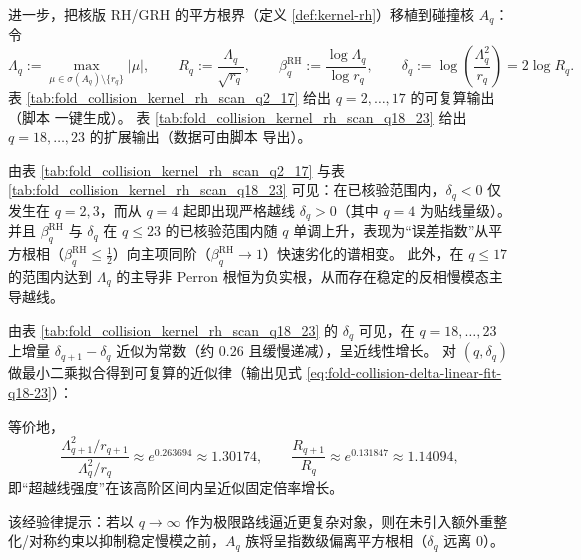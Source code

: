
进一步，把核版 RH/GRH 的平方根界（定义 \ref{def:kernel-rh}）移植到碰撞核 \(A_q\)：令
\[
\Lambda_q:=\max_{\mu\in\sigma(A_q)\setminus\{r_q\}}|\mu|,
\qquad
R_q:=\frac{\Lambda_q}{\sqrt{r_q}},
\qquad
\beta^{\mathrm{RH}}_q:=\frac{\log \Lambda_q}{\log r_q},
\qquad
\delta_q:=\log\!\left(\frac{\Lambda_q^2}{r_q}\right)=2\log R_q.
\]
表 \ref{tab:fold_collision_kernel_rh_scan_q2_17} 给出 \(q=2,\dots,17\) 的可复算输出（脚本  一键生成）。
表 \ref{tab:fold_collision_kernel_rh_scan_q18_23} 给出 \(q=18,\dots,23\) 的扩展输出（数据可由脚本  导出）。



\begin{remark}[从 \texorpdfstring{$q=4$}{q=4} 起的系统性越线与快速劣化]\label{rem:pom-collision-kernel-rh-phase}
由表 \ref{tab:fold_collision_kernel_rh_scan_q2_17} 与表 \ref{tab:fold_collision_kernel_rh_scan_q18_23} 可见：在已核验范围内，\(\delta_q<0\) 仅发生在 \(q=2,3\)，而从 \(q=4\) 起即出现严格越线 \(\delta_q>0\)（其中 \(q=4\) 为贴线量级）。
并且 \(\beta^{\mathrm{RH}}_q\) 与 \(\delta_q\) 在 \(q\le 23\) 的已核验范围内随 \(q\) 单调上升，表现为“误差指数”从平方根相（\(\beta^{\mathrm{RH}}_q\le\frac12\)）向主项同阶（\(\beta^{\mathrm{RH}}_q\to 1\)）快速劣化的谱相变。
此外，在 \(q\le 17\) 的范围内达到 \(\Lambda_q\) 的主导非 Perron 根恒为负实根，从而存在稳定的反相慢模态主导越线。
\end{remark}

\begin{remark}[高阶 \texorpdfstring{$\delta_q$}{deltaq} 的近线性律（\(q=18,\dots,23\)）]\label{rem:pom-collision-kernel-rh-linear}
由表 \ref{tab:fold_collision_kernel_rh_scan_q18_23} 的 \(\delta_q\) 可见，在 \(q=18,\dots,23\) 上增量
\(\delta_{q+1}-\delta_q\) 近似为常数（约 \(0.26\) 且缓慢递减），呈近线性增长。
对 \((q,\delta_q)\) 做最小二乘拟合得到可复算的近似律（输出见式 \eqref{eq:fold-collision-delta-linear-fit-q18-23}）：

等价地，
\[
\frac{\Lambda_{q+1}^2/r_{q+1}}{\Lambda_q^2/r_q}\approx e^{0.263694}\approx 1.30174,
\qquad
\frac{R_{q+1}}{R_q}\approx e^{0.131847}\approx 1.14094,
\]
即“超越线强度”在该高阶区间内呈近似固定倍率增长。
\par
该经验律提示：若以 \(q\to\infty\) 作为极限路线逼近更复杂对象，则在未引入额外重整化/对称约束以抑制稳定慢模之前，\(A_q\) 族将呈指数级偏离平方根相（\(\delta_q\) 远离 \(0\)）。
\end{remark}

